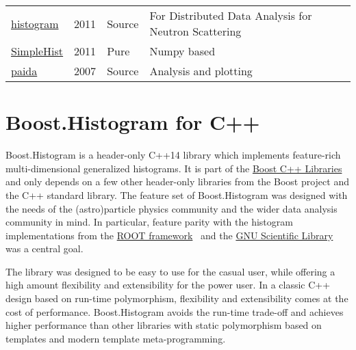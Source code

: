 \documentclass{webofc}
\begin{document}
\begin{table}[h]
\begin{tabular}{llll}
		\href{https://pypi.org/project/histogram}{histogram}                         & 2011         & Source & For Distributed Data Analysis for Neutron Scattering \\
		\href{https://pypi.org/project/SimpleHist/}{SimpleHist}                      & 2011         & Pure   & Numpy based                                          \\
		\href{https://pypi.org/project/paida/}{paida}                                & 2007         & Source & Analysis and plotting                                \\ \hline
	\end{tabular}
\end{table}


\section{Boost.Histogram for C++}
\label{sec-bh-cpp}

%

Boost.Histogram is a header-only C++14 library which implements feature-rich multi-dimensional generalized histograms. It is part of the \href{https://www.boost.org/}{Boost C++ Libraries} and only depends on a few other header-only libraries from the Boost project and the C++ standard library. The feature set of Boost.Histogram was designed with the needs of the (astro)particle physics community and the wider data analysis community in mind. In particular, feature parity with the histogram implementations from the \href{https://root.cern.ch/}{ROOT framework}~\cite{Brun:1997pa} and the \href{https://www.gnu.org/software/gsl/}{GNU Scientific Library}~\cite{gough2009gnu} was a central goal.

The library was designed to be easy to use for the casual user, while offering a high amount flexibility and extensibility for the power user. In a classic C++ design based on run-time polymorphism, flexibility and extensibility comes at the cost of performance. Boost.Histogram avoids the run-time trade-off and achieves higher performance than other libraries with static polymorphism based on templates and modern template meta-programming.
\end{document}
